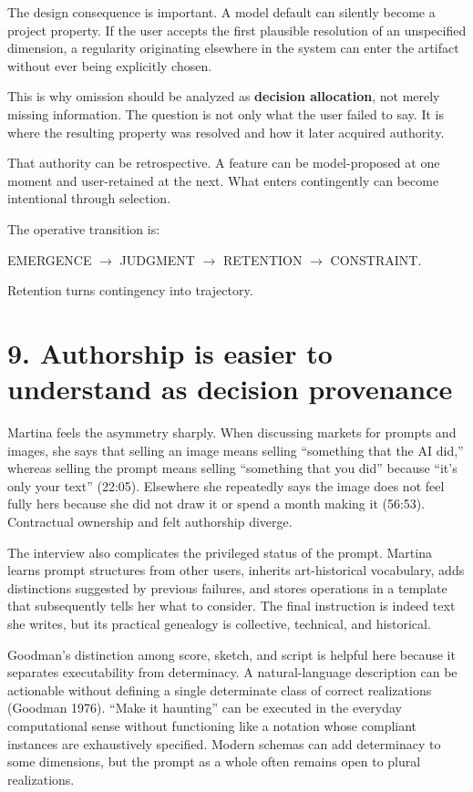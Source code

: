 \documentclass[
  11pt,
  letterpaper,
]{article}
\begin{document}
The design consequence is important. A model default can silently become
a project property. If the user accepts the first plausible resolution
of an unspecified dimension, a regularity originating elsewhere in the
system can enter the artifact without ever being explicitly chosen.

This is why omission should be analyzed as \textbf{decision allocation},
not merely missing information. The question is not only what the user
failed to say. It is where the resulting property was resolved and how
it later acquired authority.

That authority can be retrospective. A feature can be model-proposed at
one moment and user-retained at the next. What enters contingently can
become intentional through selection.

The operative transition is:

\begin{center}
EMERGENCE $\rightarrow$ JUDGMENT $\rightarrow$ RETENTION $\rightarrow$ CONSTRAINT.
\end{center}

Retention turns contingency into trajectory.

\section{9. Authorship is easier to understand as decision
provenance}\label{authorship-is-easier-to-understand-as-decision-provenance}

Martina feels the asymmetry sharply. When discussing markets for prompts
and images, she says that selling an image means selling ``something
that the AI did,'' whereas selling the prompt means selling ``something
that you did'' because ``it's only your text'' (22:05). Elsewhere she
repeatedly says the image does not feel fully hers because she did not
draw it or spend a month making it (56:53). Contractual ownership and
felt authorship diverge.

The interview also complicates the privileged status of the prompt.
Martina learns prompt structures from other users, inherits
art-historical vocabulary, adds distinctions suggested by previous
failures, and stores operations in a template that subsequently tells
her what to consider. The final instruction is indeed text she writes,
but its practical genealogy is collective, technical, and historical.

Goodman's distinction among score, sketch, and script is helpful here
because it separates executability from determinacy. A natural-language
description can be actionable without defining a single determinate
class of correct realizations (Goodman 1976). ``Make it haunting'' can
be executed in the everyday computational sense without functioning like
a notation whose compliant instances are exhaustively specified. Modern
schemas can add determinacy to some dimensions, but the prompt as a
whole often remains open to plural realizations.
\end{document}
